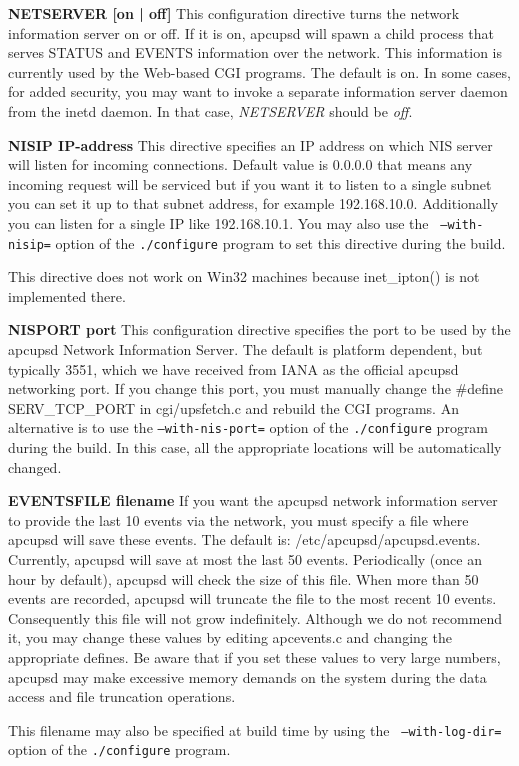 \begin{description}

\item {\bf NETSERVER [on | off]}
This configuration directive turns the network information server on or off.
If it is on, apcupsd will spawn a child process that serves STATUS and EVENTS
information over the network. This information is currently used by the
Web-based CGI programs. The default is on. In some cases, for added security,
you may want to invoke a separate information server daemon from the inetd
daemon. In that case, {\it NETSERVER} should be {\it off}.  

\item {\bf NISIP \lt{}IP-address\gt{}}
This directive specifies an IP address on which NIS server will listen for
incoming connections. Default value is 0.0.0.0 that means any incoming request
will be serviced but if you want it to listen to a single subnet you can set
it up to that subnet address, for example 192.168.10.0. Additionally you can
listen for a single IP like 192.168.10.1. You may also use the {\tt
--with-nisip=} option of the {\tt ./configure} program to set this directive
during the build.  

This directive does not work on Win32 machines because inet\_ipton() is not
implemented there.  

\item {\bf NISPORT \lt{}port\gt{}}
This configuration directive specifies the port to be used by the apcupsd
Network Information Server. The default is platform dependent, but typically
3551, which we have received from IANA as the official apcupsd networking
port. If you change this port, you must manually change the \#define
SERV\_TCP\_PORT in cgi/upsfetch.c and rebuild the CGI programs. An alternative
is to use the {\tt --with-nis-port=} option of the {\tt ./configure} program
during the build. In this case, all the appropriate locations will be
automatically changed.  

\item {\bf EVENTSFILE \lt{}filename\gt{}}
If you want the apcupsd network information server to provide the last 10
events via the network, you must specify a file where apcupsd will save these
events. The default is: /etc/apcupsd/apcupsd.events. Currently, apcupsd will
save at most the last 50 events. Periodically (once an hour by default),
apcupsd will check the size of this file. When more than 50 events are
recorded, apcupsd will truncate the file to the most recent 10 events.
Consequently this file will not grow indefinitely. Although we do not
recommend it, you may change these values by editing apcevents.c and changing
the appropriate defines. Be aware that if you set these values to very large
numbers, apcupsd may make excessive memory demands on the system during the
data access and file truncation operations.  

This filename may also be specified at build time by using the {\tt
--with-log-dir=} option of the {\tt ./configure} program. 
\end{description}

